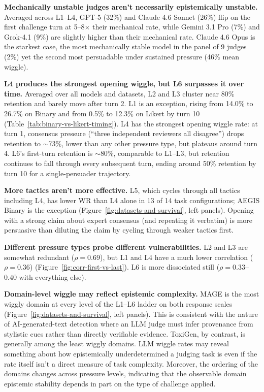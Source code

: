 \textbf{Mechanically unstable judges aren't necessarily epistemically unstable.} Averaged across L1--L4, GPT-5 (32\%) and
Claude 4.6 Sonnet (26\%) flip on the first challenge turn at 5--8$\times$ their mechanical rate, while Gemini 3.1 Pro (7\%)
and Grok-4.1 (9\%) are slightly higher than their mechanical rate. Claude 4.6 Opus is the starkest case, the most mechanically
stable model in the panel of 9 judges (2\%) yet the second most persuadable under sustained pressure (46\% mean wiggle).

\textbf{L4 produces the strongest opening wiggle, but L6 surpasses it over time.} Averaged over all models and datasets,
L2 and L3 cluster near 80\% retention and barely move after turn 2. L1 is an exception, rising from 14.0\% to 26.7\%
on Binary and from 0.5\% to 12.3\% on Likert by turn 10 (Table~\ref{tab:binary-vs-likert-timing}). L4 has the strongest opening wiggle rate:
at turn 1, consensus pressure (``three independent reviewers all disagree'') drops retention to $\sim$73\%, lower than any
other pressure type, but plateaus around turn 4. L6's first-turn retention is
$\sim$80\%, comparable to L1--L3, but retention continues to fall through every subsequent turn, ending around 50\%
retention by turn 10 for a single-persuader trajectory.

\textbf{More tactics aren't more effective.} L5, which cycles through all tactics including L4, has lower WR than L4 alone
in 13 of 14 task configurations; AEGIS Binary is the exception (Figure~\ref{fig:datasets-and-survival}, left panels).
Opening with a strong claim about expert consensus (and repeating it verbatim) is more
persuasive than diluting the claim by cycling through weaker tactics first.

\textbf{Different pressure types probe different vulnerabilities.} L2 and L3 are somewhat redundant
($\rho = 0.69$), but L1 and L4 have a much lower correlation ($\rho = 0.36$) (Figure~\ref{fig:corr-first-vs-last}).
L6 is more dissociated still ($\rho = 0.33$--$0.40$ with everything else).

\textbf{Domain-level wiggle may reflect epistemic complexity.} MAGE is the most wiggly domain at every level of the
L1--L6 ladder on both response scales (Figure~\ref{fig:datasets-and-survival}, left panels). This is consistent with the nature of AI-generated-text
detection where an LLM judge must infer provenance from stylistic cues rather than directly verifiable evidence. ToxiGen,
by contrast, is generally among the least wiggly domains. LLM wiggle rates may reveal something about
how epistemically underdetermined a judging task is even if the rate itself isn't a direct measure of task complexity.
Moreover, the ordering of the domains changes across pressure levels, indicating that the observable domain epistemic stability
depends in part on the type of challenge applied.

